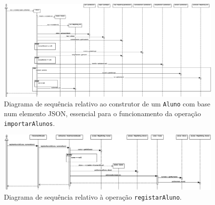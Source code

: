 \documentclass[12pt, a4paper]{article}
\begin{document}
\begin{landscape}
        \vspace*{\fill}
        \pagebreak
        \vspace*{\fill}

        \begin{figure}[H]
            \centering
            \includegraphics[scale=0.45]{Imagens/Modelos/importarAlunosConstrutor.svg.eps}
            \caption{
                Diagrama de sequência relativo ao construtor de um \texttt{Aluno} com base num
                elemento JSON, essencial para o funcionamento da operação \texttt{importarAlunos}.
            }
        \end{figure}

        \vspace*{\fill}
        \pagebreak
        \vspace*{\fill}

        \begin{figure}[H]
            \centering
            \includegraphics[scale=0.60]{Imagens/Modelos/registarAluno.svg.eps}
            \caption{
                Diagrama de sequência relativo à operação \texttt{registarAluno}.
            }
        \end{figure}

        \vspace*{\fill}
        \pagebreak
        \vspace*{\fill}


\end{landscape}
\end{document}
